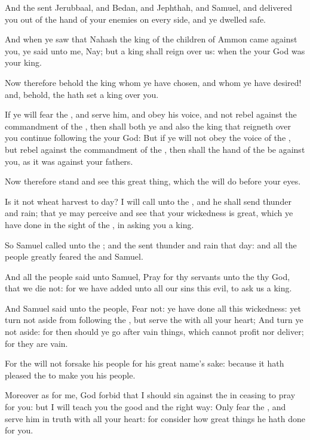 \Verse And the \LORD sent Jerubbaal, and Bedan, and Jephthah, and Samuel, and delivered you out of the hand of your enemies on every side, and ye dwelled safe.

\Verse And when ye saw that Nahash the king of the children of Ammon came against you, ye said unto me, Nay; but a king shall reign over us: when the \LORD your God was your king.

\Verse Now therefore behold the king whom ye have chosen, and whom ye have desired! and, behold, the \LORD hath set a king over you.

\Verse If ye will fear the \LORD, and serve him, and obey his voice, and not rebel against the commandment of the \LORD, then shall both ye and also the king that reigneth over you continue following the \LORD your God: \Verse But if ye will not obey the voice of the \LORD, but rebel against the commandment of the \LORD, then shall the hand of the \LORD be against you, as it was against your fathers.

\Verse Now therefore stand and see this great thing, which the \LORD will do before your eyes.

\Verse Is it not wheat harvest to day? I will call unto the \LORD, and he shall send thunder and rain; that ye may perceive and see that your wickedness is great, which ye have done in the sight of the \LORD, in asking you a king.

\Verse So Samuel called unto the \LORD; and the \LORD sent thunder and rain that day: and all the people greatly feared the \LORD and Samuel.

\Verse And all the people said unto Samuel, Pray for thy servants unto the \LORD thy God, that we die not: for we have added unto all our sins this evil, to ask us a king.

\Verse And Samuel said unto the people, Fear not: ye have done all this wickedness: yet turn not aside from following the \LORD, but serve the \LORD with all your heart; \Verse And turn ye not aside: for then should ye go after vain things, which cannot profit nor deliver; for they are vain.

\Verse For the \LORD will not forsake his people for his great name's sake: because it hath pleased the \LORD to make you his people.

\Verse Moreover as for me, God forbid that I should sin against the \LORD in ceasing to pray for you: but I will teach you the good and the right way: \Verse Only fear the \LORD, and serve him in truth with all your heart: for consider how great things he hath done for you.


